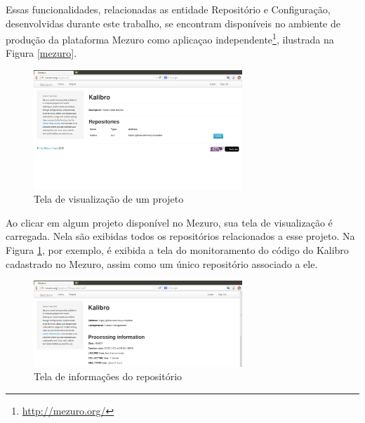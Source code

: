 
Essas funcionalidades, relacionadas as entidade Repositório e Configuração, desenvolvidas durante este trabalho, se encontram disponíveis no ambiente de produção da plataforma Mezuro como aplicaçao independente\footnote{\url{http://mezuro.org/}},  ilustrada na Figura \ref{mezuro}.

\graphicspath{{figuras/}}
\begin{figure}[h]
\centering
\includegraphics[width=0.7\textwidth]{mezuro-repositories}
\caption{Tela de visualização de um projeto}
\label{fig:mezuro-repositories}
\end{figure}

Ao clicar em algum projeto disponível no Mezuro, sua tela de visualização é carregada. Nela são exibidas todos os repositórios relacionados a esse projeto. Na Figura \ref{fig:mezuro-repositories}, por exemplo, é exibida a tela do monitoramento do código do Kalibro cadastrado no Mezuro, assim como um único repositório associado a ele.

\graphicspath{{figuras/}}
\begin{figure}[h]
\centering
\includegraphics[width=0.7\textwidth]{mezuro-info}
\caption{Tela de informações do repositório}
\label{fig:mezuro-info}
\end{figure}

